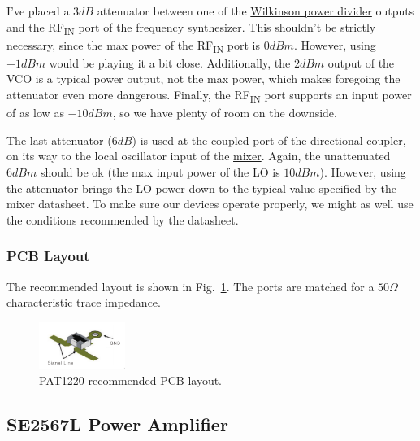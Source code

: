 I've placed a $3 \si{dB}$ attenuator between one of the \hyperref[sec:pd4859j5050s2hf]{Wilkinson
  power divider} outputs and the RF\textsubscript{IN} port of the \hyperref[sec:adf4158]{frequency
  synthesizer}. This shouldn't be strictly necessary, since the max power of the
RF\textsubscript{IN} port is $0 \si{dBm}$. However, using $-1 \si{dBm}$ would be playing it a bit
close. Additionally, the $2 \si{dBm}$ output of the VCO is a typical power output, not the max
power, which makes foregoing the attenuator even more dangerous. Finally, the RF\textsubscript{IN}
port supports an input power of as low as $-10 \si{dBm}$, so we have plenty of room on the downside.

The last attenuator ($6 \si{dB}$) is used at the coupled port of the
\hyperref[sec:dc4759j5020ahf]{directional coupler}, on its way to the local oscillator input of the
\hyperref[sec:adl5802]{mixer}. Again, the unattenuated $6 \si{dBm}$ should be ok (the max input
power of the LO is $10 \si{dBm}$). However, using the attenuator brings the LO power down to the
typical value specified by the mixer datasheet. To make sure our devices operate properly, we might
as well use the conditions recommended by the datasheet.

\subsubsection{PCB Layout}
\label{sec:pat1220-pcb-layout}

The recommended layout is shown in Fig.~\ref{fig:pat1220-pcb}. The ports are matched for a $50
\si{\Omega}$ characteristic trace impedance.

\begin{figure}[h]
        \centering
        \includegraphics[width=0.25\textwidth]{data/pat1220-pcb}
        \caption{PAT1220 recommended PCB layout.}
        \label{fig:pat1220-pcb}
\end{figure}

\subsection{SE2567L Power Amplifier}
\label{sec:se2567l-power-amp}


